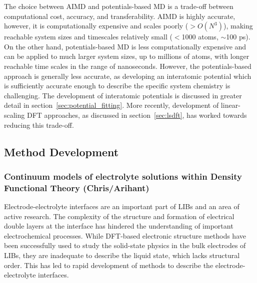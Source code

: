 \documentclass[../main.tex]{subfiles}
\begin{document}
The choice between AIMD and potentials-based MD is a trade-off between computational cost, accuracy, and transferability. AIMD is highly accurate, however, it is computationally expensive and scales poorly ($>O(N^3)$), making reachable system sizes and timescales relatively small ($<$1000 atoms, $\sim$100 ps). On the other hand, potentials-based MD is less computationally expensive and can be applied to much larger system sizes, up to millions of atoms, with longer reachable time scales in the range of nanoseconds. However, the potentials-based approach is generally less accurate, as developing an interatomic potential which is sufficiently accurate enough to describe the specific system chemistry is challenging. The development of interatomic potentials is discussed in greater detail in section~\ref{sec:potential_fitting}. More recently, development of linear-scaling DFT approaches, as discussed in section~\ref{sec:lsdft}, has worked towards reducing this trade-off.

\subsection{Method Development}

\subsubsection{Continuum models of electrolyte solutions within Density Functional Theory (Chris/Arihant)}
\label{sec:dft+cont}
Electrode-electrolyte interfaces are an important part of LIBs and an area of active research.\cite{Gauthier2015, yu2018electrode} The complexity of the structure and formation of electrical double layers at the interface has hindered the understanding of important electrochemical processes. While DFT-based electronic structure methods have been successfully used to study the solid-state physics in the bulk electrodes of LIBs, they are inadequate to describe the liquid state, which lacks structural order. This has led to rapid development of methods to describe the electrode-electrolyte interfaces.\cite{Jinnouchi2018} 
\end{document}
